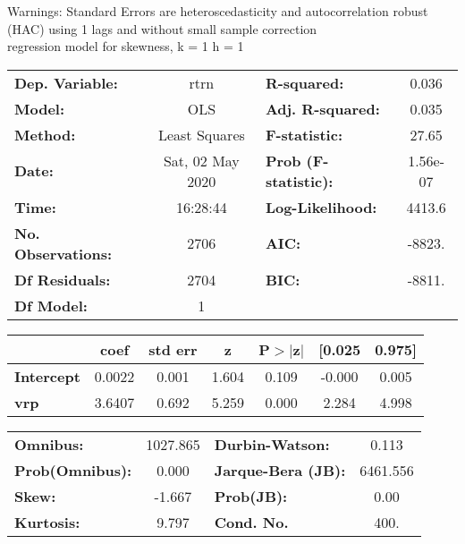 Warnings: \newline
 [1] Standard Errors are heteroscedasticity and autocorrelation robust (HAC) using 1 lags and without small sample correction\\ 

regression model for skewness, k = 1 h = 1\begin{center}
\begin{tabular}{lclc}
\toprule
\textbf{Dep. Variable:}    &       rtrn       & \textbf{  R-squared:         } &     0.036   \\
\textbf{Model:}            &       OLS        & \textbf{  Adj. R-squared:    } &     0.035   \\
\textbf{Method:}           &  Least Squares   & \textbf{  F-statistic:       } &     27.65   \\
\textbf{Date:}             & Sat, 02 May 2020 & \textbf{  Prob (F-statistic):} &  1.56e-07   \\
\textbf{Time:}             &     16:28:44     & \textbf{  Log-Likelihood:    } &    4413.6   \\
\textbf{No. Observations:} &        2706      & \textbf{  AIC:               } &    -8823.   \\
\textbf{Df Residuals:}     &        2704      & \textbf{  BIC:               } &    -8811.   \\
\textbf{Df Model:}         &           1      & \textbf{                     } &             \\
\bottomrule
\end{tabular}
\begin{tabular}{lcccccc}
                   & \textbf{coef} & \textbf{std err} & \textbf{z} & \textbf{P$> |$z$|$} & \textbf{[0.025} & \textbf{0.975]}  \\
\midrule
\textbf{Intercept} &       0.0022  &        0.001     &     1.604  &         0.109        &       -0.000    &        0.005     \\
\textbf{vrp}       &       3.6407  &        0.692     &     5.259  &         0.000        &        2.284    &        4.998     \\
\bottomrule
\end{tabular}
\begin{tabular}{lclc}
\textbf{Omnibus:}       & 1027.865 & \textbf{  Durbin-Watson:     } &    0.113  \\
\textbf{Prob(Omnibus):} &   0.000  & \textbf{  Jarque-Bera (JB):  } & 6461.556  \\
\textbf{Skew:}          &  -1.667  & \textbf{  Prob(JB):          } &     0.00  \\
\textbf{Kurtosis:}      &   9.797  & \textbf{  Cond. No.          } &     400.  \\
\bottomrule
\end{tabular}
\end{center}

